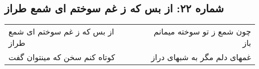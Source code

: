 \begin{center}
\section*{شماره ۲۲: از بس که ز غم سوختم ای شمع طراز}
\label{sec:022}
\begin{longtable}{l p{0.5cm} r}
از بس که ز غم سوختم ای شمع طراز
&&
چون شمع ز تو سوخته میمانم باز
\\
کوتاه کنم سخن که مینتوان گفت
&&
غمهای دلم مگر به شبهای دراز
\\
\end{longtable}
\end{center}
